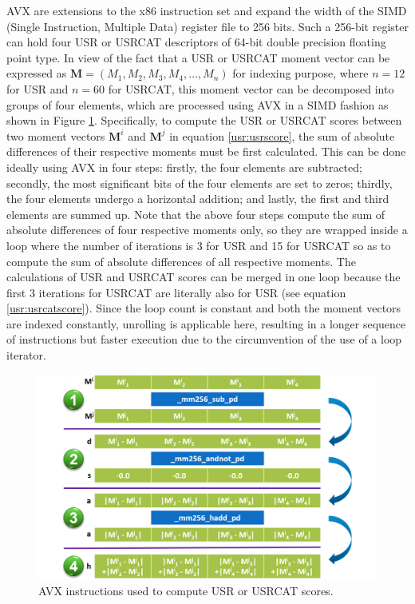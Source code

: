 AVX are extensions to the x86 instruction set and expand the width of the SIMD (Single Instruction, Multiple Data) register file to 256 bits. Such a 256-bit register can hold four USR or USRCAT descriptors of 64-bit double precision floating point type. In view of the fact that a USR or USRCAT moment vector can be expressed as $\mathbf M=(M_1, M_2, M_3, M_4, \ldots, M_n)$ for indexing purpose, where $n=12$ for USR and $n=60$ for USRCAT, this moment vector can be decomposed into groups of four elements, which are processed using AVX in a SIMD fashion as shown in Figure \ref{usr:AVX}. Specifically, to compute the USR or USRCAT scores between two moment vectors $\mathbf M^i$ and $\mathbf M^j$ in equation \eqref{usr:usrscore}, the sum of absolute differences of their respective moments must be first calculated. This can be done ideally using AVX in four steps: firstly, the four elements are subtracted; secondly, the most significant bits of the four elements are set to zeros; thirdly, the four elements undergo a horizontal addition; and lastly, the first and third elements are summed up. Note that the above four steps compute the sum of absolute differences of four respective moments only, so they are wrapped inside a loop where the number of iterations is 3 for USR and 15 for USRCAT so as to compute the sum of absolute differences of all respective moments. The calculations of USR and USRCAT scores can be merged in one loop because the first 3 iterations for USRCAT are literally also for USR (see equation \eqref{usr:usrcatscore}). Since the loop count is constant and both the moment vectors are indexed constantly, unrolling is applicable here, resulting in a longer sequence of instructions but faster execution due to the circumvention of the use of a loop iterator.

\begin{figure}
\begin{center}
\includegraphics[width=\linewidth]{../usr/AVX.png}
\end{center}
\caption{AVX instructions used to compute USR or USRCAT scores.}
\label{usr:AVX}
\end{figure}

